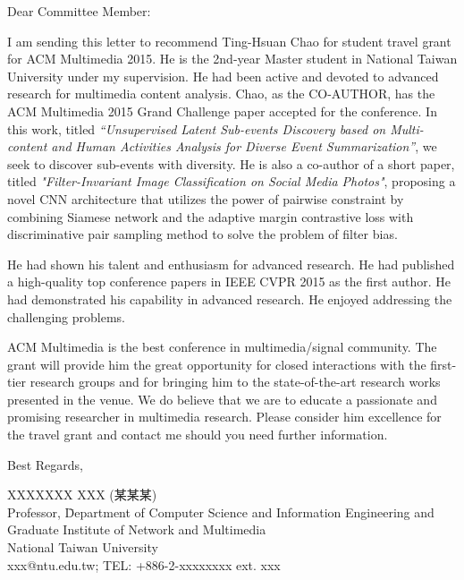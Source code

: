 \documentclass[12pt,letterpaper]{article}
\begin{document}
\begin{spacing}{1.05}
Dear Committee Member:

I am sending this letter to recommend Ting-Hsuan Chao for student travel grant for ACM Multimedia 2015. He is the 2nd-year Master student in National Taiwan University under my supervision. He had been active and devoted to advanced research for multimedia content analysis. Chao, as the CO-AUTHOR, has the ACM Multimedia 2015 Grand Challenge paper accepted for the conference. In this work, titled \textit{“Unsupervised Latent Sub-events Discovery based on Multi-content and Human Activities Analysis for Diverse Event Summarization”}, we seek to discover sub-events with diversity. He is also a co-author of a short paper, titled \textit{"Filter-Invariant Image Classification on Social Media Photos"}, proposing a novel CNN architecture that utilizes the power of pairwise constraint by combining Siamese network and the adaptive margin contrastive loss with discriminative pair sampling method to solve the problem of filter bias.

He had shown his talent and enthusiasm for advanced research. He had published a high-quality top conference papers in IEEE CVPR 2015 as the first author. He had demonstrated his capability in advanced research. He enjoyed addressing the challenging problems.

ACM Multimedia is the best conference in multimedia/signal community. The grant will provide him the great opportunity for closed interactions with the first-tier research groups and for bringing him to the state-of-the-art research works presented in the venue. We do believe that we are to educate a passionate and promising researcher in multimedia research. Please consider him excellence for the travel grant and contact me should you need further information.

\vfill
Best Regards,

\end{spacing}

\begin{tabbing}
XXXXXXX XXX (某某某)\\
Professor, \= Department of Computer Science and Information Engineering and \\
\> Graduate Institute of Network and Multimedia\\
National Taiwan University\\
xxx@ntu.edu.tw; TEL: +886-2-xxxxxxxx ext. xxx
\end{tabbing}
\end{document}

